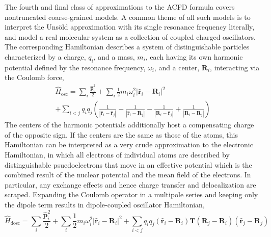 The fourth and final class of approximations to the ACFD formula covers nontruncated coarse-grained models.
A common theme of all such models is to interpret the Unsöld approximation with its single resonance frequency literally, and model a real molecular system as a collection of coupled charged oscillators.
The corresponding Hamiltonian describes a system of distinguishable particles characterized by a charge, $q_i$, and a mass, $m_i$, each having its own harmonic potential defined by the resonance frequency, $\omega_i$, and a center, $\mathbf R_i$, interacting via the Coulomb force,
\begin{multline}
  \hat H_\text{osc}=\sum_i\frac{\mathbf{\hat p}_i^2}2+\sum_i\frac12 m_i\omega_i^2|\mathbf{\hat r}_i-\mathbf R_i|^2 \\
  +\sum_{i<j}q_i q_j\left(
    \frac1{|\mathbf{\hat r}_i-\mathbf{\hat r}_j|}
    -\frac1{|\mathbf{\hat r}_i-\mathbf R_j|}
    -\frac1{|\mathbf R_i-\mathbf{\hat r}_j|}
    +\frac1{|\mathbf R_i-\mathbf R_j|}
  \right)
\end{multline}
The centers of the harmonic potentials additionally host a compensating charge of the opposite sign.
If the centers are the same as those of the atoms, this Hamiltonian can be interpreted as a very crude approximation to the electronic Hamiltonian, in which all electrons of individual atoms are described by distinguishable psuedoelectrons that move in an effective potential which is the combined result of the nuclear potential and the mean field of the electrons.
In particular, any exchange effects and hence charge transfer and delocalization are scraped.
Expanding the Coulomb operator in a multipole series and keeping only the dipole term results in dipole-coupled oscillator Hamiltonian,
\begin{equation}
  \hat H_\text{dosc}=\sum_i\frac{\mathbf{\hat p}_i^2}2+\sum_i\frac12 m_i\omega_i^2|\mathbf{\hat r}_i-\mathbf R_i|^2+\sum_{i<j}q_i q_j(\mathbf{\hat r}_i-\mathbf R_i)\mathbf T(\mathbf R_j-\mathbf R_i)(\mathbf{\hat r}_j-\mathbf R_j)
  \label{eq:mbd}
\end{equation}

